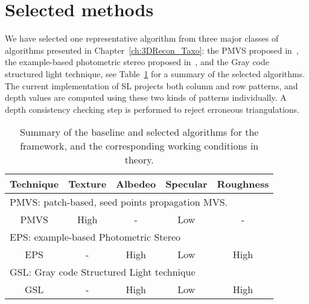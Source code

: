 \section{Selected methods}
We have selected one representative algorithm from three major classes of algorithms presented in Chapter~\ref{ch:3DRecon_Taxo}: the PMVS proposed in~\cite{furukawa2010accurate}, the example-based photometric stereo proposed in~\cite{hertzmann2005example}, and the Gray code structured light technique, see Table~\ref{tab:selected_algos} for a summary of the selected algorithms. The current implementation of SL projects both column and row patterns, and depth values are computed using these two kinds of patterns individually. A depth consistency checking step is performed to reject erroneous triangulations.
\begin{table}[!htbp]
\centering
\begin{tabular}{c|c|c|c|c}
\hline
Technique & Texture & Albedeo & Specular & Roughness\\
\hline\hline
\multicolumn{5}{l}{PMVS: patch-based, seed points propagation MVS.}\\
\hline
PMVS & High & - & Low & -\\
\hline\hline
\multicolumn{5}{l}{EPS: example-based Photometric Stereo}\\
\hline
EPS & - & High & Low & High \\
\hline\hline
\multicolumn{5}{l}{GSL: Gray code Structured Light technique}\\
\hline
GSL & - & High & Low & High\\
\hline
\end{tabular}
\caption{Summary of the baseline and selected algorithms for the framework, and the corresponding working conditions in theory.}
\label{tab:selected_algos}
\end{table}

